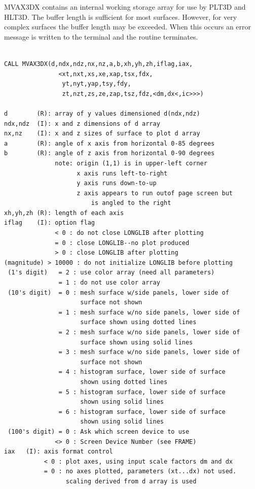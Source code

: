 \documentclass[11pt]{report}
\begin{document}
MVAX3DX contains an internal working storage array for use by
PLT3D and HLT3D.  The buffer length is sufficient for most surfaces. 
However, for
very complex surfaces the buffer length may be exceeded.  When this occurs
an error message is written to the terminal and the routine terminates.
\begin{verbatim}

CALL MVAX3DX(d,ndx,ndz,nx,nz,a,b,xh,yh,zh,iflag,iax,
               <xt,nxt,xs,xe,xap,tsx,fdx,
                yt,nyt,yap,tsy,fdy,
                zt,nzt,zs,ze,zap,tsz,fdz,<dm,dx<,ic>>>)

d        (R): array of y values dimensioned d(ndx,ndz)
ndx,ndz  (I): x and z dimensions of d array
nx,nz    (I): x and z sizes of surface to plot d array
a        (R): angle of x axis from horizontal 0-85 degrees
b        (R): angle of z axis from horizontal 0-90 degrees
              note: origin (1,1) is in upper-left corner
                    x axis runs left-to-right
                    y axis runs down-to-up
                    z axis appears to run outof page screen but
                        is angled to the right
xh,yh,zh (R): length of each axis
iflag    (I): option flag
              < 0 : do not close LONGLIB after plotting
              = 0 : close LONGLIB--no plot produced
              > 0 : close LONGLIB after plotting
(magnitude) > 10000 : do not initialize LONGLIB before plotting
 (1's digit)   = 2 : use color array (need all parameters)
               = 1 : do not use color array 
 (10's digit)  = 0 : mesh surface w/side panels, lower side of
                     surface not shown
               = 1 : mesh surface w/no side panels, lower side of
                     surface shown using dotted lines
               = 2 : mesh surface w/no side panels, lower side of
                     surface shown using solid lines
               = 3 : mesh surface w/no side panels, lower side of
                     surface not shown
               = 4 : histogram surface, lower side of surface
                     shown using dotted lines
               = 5 : histogram surface, lower side of surface
                     shown using solid lines
               = 6 : histogram surface, lower side of surface
                     shown using solid lines
 (100's digit) = 0 : Ask which screen device to use
              <> 0 : Screen Device Number (see FRAME)
iax   (I): axis format control
           < 0 : plot axes, using input scale factors dm and dx
           = 0 : no axes plotted, parameters (xt...dx) not used.
                 scaling derived from d array is used

\end{verbatim}
\end{document}

